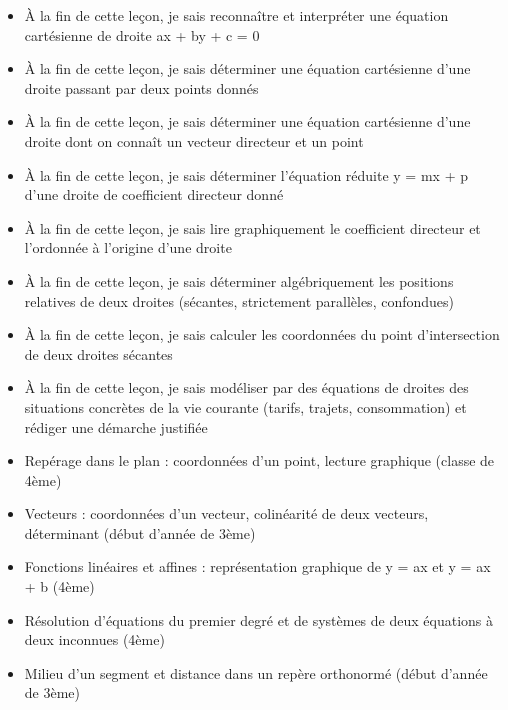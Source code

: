 \documentclass[11pt]{article}
\begin{document}
\begin{objectifs}
\begin{itemize}
\item À la fin de cette leçon, je sais reconnaître et interpréter une équation cartésienne de droite ax + by + c = 0
\item À la fin de cette leçon, je sais déterminer une équation cartésienne d'une droite passant par deux points donnés
\item À la fin de cette leçon, je sais déterminer une équation cartésienne d'une droite dont on connaît un vecteur directeur et un point
\item À la fin de cette leçon, je sais déterminer l'équation réduite y = mx + p d'une droite de coefficient directeur donné
\item À la fin de cette leçon, je sais lire graphiquement le coefficient directeur et l'ordonnée à l'origine d'une droite
\item À la fin de cette leçon, je sais déterminer algébriquement les positions relatives de deux droites (sécantes, strictement parallèles, confondues)
\item À la fin de cette leçon, je sais calculer les coordonnées du point d'intersection de deux droites sécantes
\item À la fin de cette leçon, je sais modéliser par des équations de droites des situations concrètes de la vie courante (tarifs, trajets, consommation) et rédiger une démarche justifiée
\end{itemize}
\end{objectifs}

\begin{prerequis}
\begin{itemize}
\item Repérage dans le plan : coordonnées d'un point, lecture graphique (classe de 4ème)
\item Vecteurs : coordonnées d'un vecteur, colinéarité de deux vecteurs, déterminant (début d'année de 3ème)
\item Fonctions linéaires et affines : représentation graphique de y = ax et y = ax + b (4ème)
\item Résolution d'équations du premier degré et de systèmes de deux équations à deux inconnues (4ème)
\item Milieu d'un segment et distance dans un repère orthonormé (début d'année de 3ème)
\end{itemize}
\end{prerequis}
\end{document}
